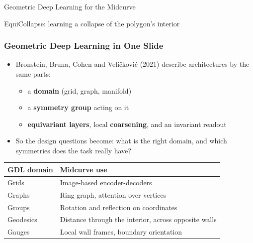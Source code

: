 \begin{frame}[fragile]\frametitle{}
\begin{center}
{\Large Geometric Deep Learning for the Midcurve}

\vspace{4pt}
EquiCollapse: learning a collapse of the polygon's interior
\end{center}
\end{frame}

\begin{frame}[fragile]\frametitle{Geometric Deep Learning in One Slide}
\begin{itemize}
\item Bronstein, Bruna, Cohen and Veli\v{c}kovi\'{c} (2021) describe architectures by the same parts:
  \begin{itemize}
  \item a \textbf{domain} (grid, graph, manifold)
  \item a \textbf{symmetry group} acting on it
  \item \textbf{equivariant layers}, local \textbf{coarsening}, and an invariant readout
  \end{itemize}
\item So the design questions become: what is the right domain, and which symmetries does the task really have?
\end{itemize}

\vspace{4pt}
\begin{center}
\small
\begin{tabular}{@{}ll@{}}
\toprule
\textbf{GDL domain} & \textbf{Midcurve use} \\
\midrule
Grids & Image-based encoder-decoders \\
Graphs & Ring graph, attention over vertices \\
Groups & Rotation and reflection on coordinates \\
Geodesics & Distance through the interior, across opposite walls \\
Gauges & Local wall frames, boundary orientation \\
\bottomrule
\end{tabular}
\end{center}
\end{frame}

